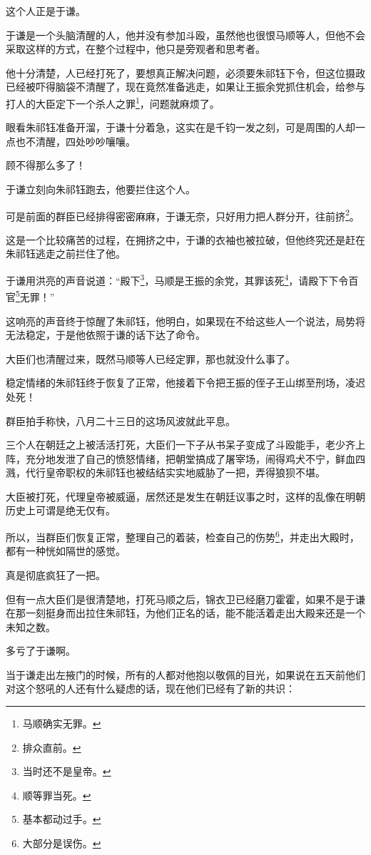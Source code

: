 \begin{multicols}{\theparacolNo}
这个人正是于谦。

于谦是一个头脑清醒的人，他并没有参加斗殴，虽然他也很恨马顺等人，但他不会采取这样的方式，在整个过程中，他只是旁观者和思考者。

他十分清楚，人已经打死了，要想真正解决问题，必须要朱祁钰下令，但这位摄政已经被吓得脑袋不清醒了，现在竟然准备逃走，如果让王振余党抓住机会，给参与打人的大臣定下一个杀人之罪\footnote{马顺确实无罪。}，问题就麻烦了。

眼看朱祁钰准备开溜，于谦十分着急，这实在是千钧一发之刻，可是周围的人却一点也不清醒，四处吵吵嚷嚷。

顾不得那么多了！

于谦立刻向朱祁钰跑去，他要拦住这个人。

可是前面的群臣已经排得密密麻麻，于谦无奈，只好用力把人群分开，往前挤\footnote{排众直前。}。

这是一个比较痛苦的过程，在拥挤之中，于谦的衣袖也被拉破，但他终究还是赶在朱祁钰逃走之前拦住了他。

于谦用洪亮的声音说道：“殿下\footnote{当时还不是皇帝。}，马顺是王振的余党，其罪该死\footnote{顺等罪当死。}，请殿下下令百官\footnote{基本都动过手。}无罪！”

这响亮的声音终于惊醒了朱祁钰，他明白，如果现在不给这些人一个说法，局势将无法稳定，于是他依照于谦的话下达了命令。

大臣们也清醒过来，既然马顺等人已经定罪，那也就没什么事了。

稳定情绪的朱祁钰终于恢复了正常，他接着下令把王振的侄子王山绑至刑场，凌迟处死！

群臣拍手称快，八月二十三日的这场风波就此平息。

三个人在朝廷之上被活活打死，大臣们一下子从书呆子变成了斗殴能手，老少齐上阵，充分地发泄了自己的愤怒情绪，把朝堂搞成了屠宰场，闹得鸡犬不宁，鲜血四溅，代行皇帝职权的朱祁钰也被结结实实地威胁了一把，弄得狼狈不堪。

大臣被打死，代理皇帝被威逼，居然还是发生在朝廷议事之时，这样的乱像在明朝历史上可谓是绝无仅有。

所以，当群臣们恢复正常，整理自己的着装，检查自己的伤势\footnote{大部分是误伤。}，并走出大殿时，都有一种恍如隔世的感觉。

真是彻底疯狂了一把。

但有一点大臣们是很清楚地，打死马顺之后，锦衣卫已经磨刀霍霍，如果不是于谦在那一刻挺身而出拉住朱祁钰，为他们正名的话，能不能活着走出大殿来还是一个未知之数。

多亏了于谦啊。

当于谦走出左掖门的时候，所有的人都对他抱以敬佩的目光，如果说在五天前他们对这个怒吼的人还有什么疑虑的话，现在他们已经有了新的共识：


\end{multicols}
